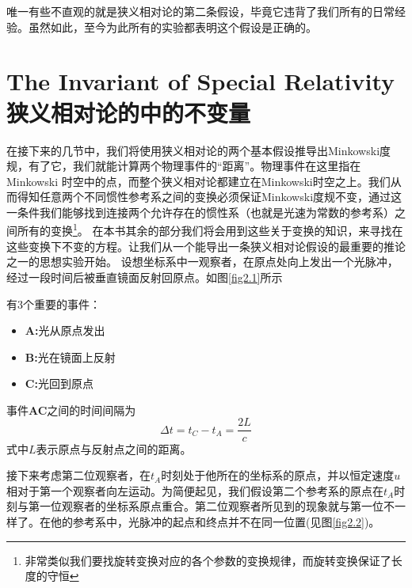 唯一有些不直观的就是狭义相对论的第二条假设，毕竟它违背了我们所有的日常经验。虽然如此，至今为此所有的实验都表明这个假设是正确的。
\section[狭义相对论的中的不变量]{The Invariant of Special Relativity \quad 狭义相对论的中的不变量}
\label{sec2.1}
在接下来的几节中，我们将使用狭义相对论的两个基本假设推导出Minkowski度规，有了它，我们就能计算两个物理事件的“距离”。物理事件在这里指在Minkowski 时空中的点，而整个狭义相对论都建立在Minkowski时空之上。我们从而得知任意两个不同惯性参考系之间的变换必须保证Minkowski度规不变，通过这一条件我们能够找到连接两个允许存在的惯性系（也就是光速为常数的参考系）之间所有的变换\footnote{非常类似我们要找旋转变换对应的各个参数的变换规律，而旋转变换保证了长度的守恒}。
在本书其余的部分我们将会用到这些关于变换的知识，来寻找在这些变换下不变的方程。让我们从一个能导出一条狭义相对论假设的最重要的推论之一的思想实验开始。
{}
设想坐标系中一观察者，在原点处向上发出一个光脉冲，经过一段时间后被垂直镜面反射回原点。如图\ref{fig2.1}所示

有3个重要的事件：
\begin{itemize}
  \item {\bf{A:}}光从原点发出
  \item {\bf{B:}}光在镜面上反射
  \item {\bf{C:}}光回到原点
\end{itemize}
事件{\bf{AC}}之间的时间间隔为
\begin{equation}\label{equ2.1}
\Delta t=t_C-t_A=\frac{2L}{c}
\end{equation}
式中$L$表示原点与反射点之间的距离。

{}


接下来考虑第二位观察者，在$t_A$时刻处于他所在的坐标系的原点，并以恒定速度$u$相对于第一个观察者向左运动。为简便起见，我们假设第二个参考系的原点在$t_A$时刻与第一位观察者的坐标系原点重合。第二位观察者所见到的现象就与第一位不一样了。在他的参考系中，光脉冲的起点和终点并不在同一位置(见图\ref{fig2.2})。

